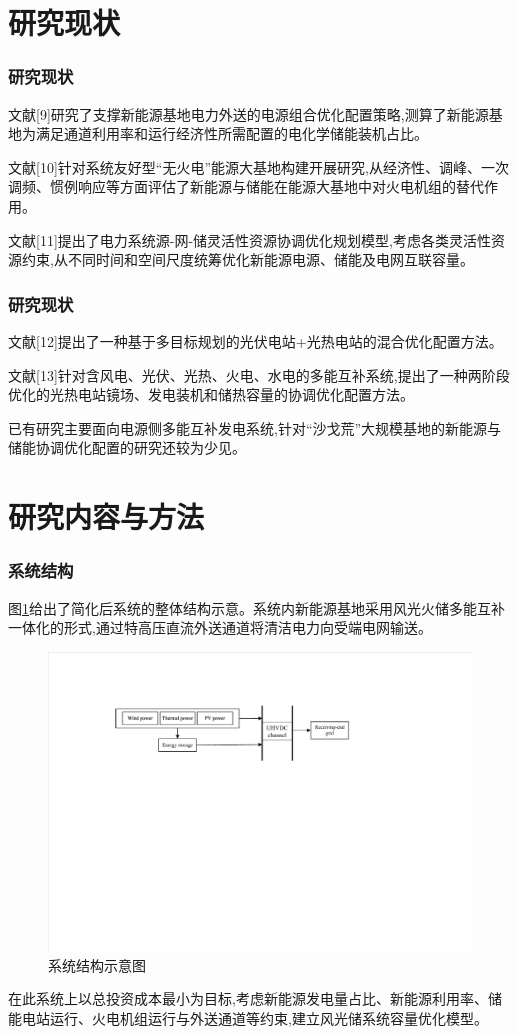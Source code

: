 \documentclass{beamer}
\begin{document}
\section{研究现状}

\begin{frame}
	\frametitle{研究现状} 
    文献[9]研究了支撑新能源基地电力外送的电源组合优化配置策略,测算了新能源基地为满足通道利用率和运行经济性所需配置的电化学储能装机占比。
	
	文献[10]针对系统友好型“无火电”能源大基地构建开展研究,从经济性、调峰、一次调频、惯例响应等方面评估了新能源与储能在能源大基地中对火电机组的替代作用。
	
	文献[11]提出了电力系统源-网-储灵活性资源协调优化规划模型,考虑各类灵活性资源约束,从不同时间和空间尺度统筹优化新能源电源、储能及电网互联容量。
\end{frame}

\begin{frame}
	\frametitle{研究现状} 
	文献[12]提出了一种基于多目标规划的光伏电站+光热电站的混合优化配置方法。
	
	文献[13]针对含风电、光伏、光热、火电、水电的多能互补系统,提出了一种两阶段优化的光热电站镜场、发电装机和储热容量的协调优化配置方法。

	已有研究主要面向电源侧多能互补发电系统,针对“沙戈荒”大规模基地的新能源与储能协调优化配置的研究还较为少见。
\end{frame}

\section{研究内容与方法}

\begin{frame}
	\frametitle{系统结构} 
	图\ref*{fig.1}给出了简化后系统的整体结构示意。系统内新能源基地采用风光火储多能互补一体化的形式,通过特高压直流外送通道将清洁电力向受端电网输送。
	\begin{figure}[htbp]  
		\centering  
		\includegraphics[scale=0.6]{./pic/系统结构示意图.pdf}
		\caption{系统结构示意图}
		\label{fig.1}
	\end{figure}
	在此系统上以总投资成本最小为目标,考虑新能源发电量占比、新能源利用率、储能电站运行、火电机组运行与外送通道等约束,建立风光储系统容量优化模型。
\end{frame}
\end{document}
